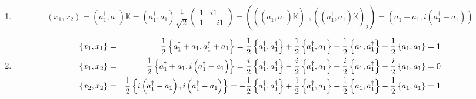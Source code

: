 \documentclass[aps,preprint]{revtex4}
\begin{document}
\begin{enumerate}
\begin{enumerate}
\item 
\begin{equation}
\left( x_{1},x_{2}\right) =\left( a_{1}^{\dagger },a_{1}\right) \mathbb{K}%
=\left( a_{1}^{\dagger },a_{1}\right) \frac{1}{\sqrt{2}}\left( 
\begin{array}{cc}
1 & i1 \\ 
1 & -i1%
\end{array}%
\right) =\left( \overset{}{\left( \overset{}{\left( a_{1}^{\dagger
},a_{1}\right) \mathbb{K}}\right) _{1},\left( \overset{}{\left(
a_{1}^{\dagger },a_{1}\right) \mathbb{K}}\right) _{2}}\right) =\left(
a_{1}^{\dagger }+a_{1},i\left( a_{1}^{\dagger }-a_{1}\right) \right)
\end{equation}

\item 
\begin{eqnarray}
\left\{ x_{1},x_{1}\right\} &=&\frac{1}{2}\left\{ a_{1}^{\dagger
}+a_{1},a_{1}^{\dagger }+a_{1}\right\} =\frac{1}{2}\left\{ a_{1}^{\dagger
},a_{1}^{\dagger }\right\} +\frac{1}{2}\left\{ a_{1}^{\dagger
},a_{1}\right\} +\frac{1}{2}\left\{ a_{1},a_{1}^{\dagger }\right\} +\frac{1}{%
2}\left\{ a_{1},a_{1}\right\} =1 \\
\left\{ x_{1},x_{2}\right\} &=&\frac{1}{2}\left\{ a_{1}^{\dagger
}+a_{1},i\left( a_{1}^{\dagger }-a_{1}\right) \right\} =\frac{i}{2}\left\{
a_{1}^{\dagger },a_{1}^{\dagger }\right\} -\frac{i}{2}\left\{ a_{1}^{\dagger
},a_{1}\right\} +\frac{i}{2}\left\{ a_{1},a_{1}^{\dagger }\right\} -\frac{i}{%
2}\left\{ a_{1},a_{1}\right\} =0 \\
\left\{ x_{2},x_{2}\right\} &=&\frac{1}{2}\left\{ i\left( a_{1}^{\dagger
}-a_{1}\right) ,i\left( a_{1}^{\dagger }-a_{1}\right) \right\} =-\frac{1}{2}%
\left\{ a_{1}^{\dagger },a_{1}^{\dagger }\right\} +\frac{1}{2}\left\{
a_{1}^{\dagger },a_{1}\right\} +\frac{1}{2}\left\{ a_{1},a_{1}^{\dagger
}\right\} -\frac{1}{2}\left\{ a_{1},a_{1}\right\} =1
\end{eqnarray}
\end{enumerate}


\end{enumerate}
\end{document}
